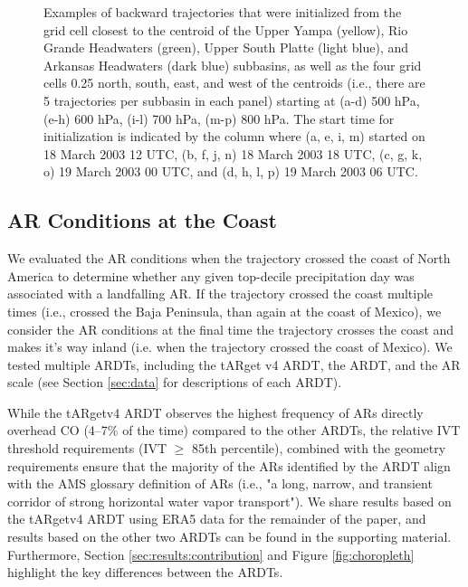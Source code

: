 \documentclass[draft]{agujournal2019}
\begin{document}
\begin{figure}
\caption{Examples of backward trajectories that were initialized from the grid cell closest to the centroid of the Upper Yampa (yellow), Rio Grande Headwaters (green), Upper South Platte (light blue), and Arkansas Headwaters (dark blue) subbasins, as well as the four grid cells 0.25\textdegree{} north, south, east, and west of the centroids (i.e., there are 5 trajectories per subbasin in each panel) starting at (a-d) 500 hPa, (e-h) 600 hPa, (i-l) 700 hPa, (m-p) 800 hPa. The start time for initialization is indicated by the column where (a, e, i, m) started on 18 March 2003 12 UTC, (b, f, j, n) 18 March 2003 18 UTC, (c, g, k, o) 19 March 2003 00 UTC, and (d, h, l, p) 19 March 2003 06 UTC.}
\label{fig:sensitivity_tests}
\end{figure}

\subsection{AR Conditions at the Coast}
\label{sec:methods:ar_conditions}
We evaluated the AR conditions when the trajectory crossed the coast of North America to determine whether any given top-decile precipitation day was associated with a landfalling AR. If the trajectory crossed the coast multiple times (i.e., crossed the Baja Peninsula, than again at the coast of Mexico), we consider the AR conditions at the final time the trajectory crosses the coast and makes it's way inland (i.e. when the trajectory crossed the coast of Mexico). We tested multiple ARDTs, including the  tARget v4 ARDT, the  ARDT, and the AR scale \cite{MartinRalph2019} (see Section \ref{sec:data} for descriptions of each ARDT).

While the tARgetv4 ARDT observes the highest frequency of ARs directly overhead CO (4--7\% of the time) compared to the other ARDTs, the relative IVT threshold requirements (IVT $\geq$ 85th percentile), combined with the geometry requirements ensure that the majority of the ARs identified by the ARDT align with the AMS glossary definition of ARs (i.e., "a long, narrow, and transient corridor of strong horizontal water vapor transport"). We share results based on the tARgetv4 ARDT using ERA5 data for the remainder of the paper, and results based on the other two ARDTs can be found in the supporting material. Furthermore, Section \ref{sec:results:contribution} and Figure \ref{fig:choropleth} highlight the key differences between the ARDTs. 

\end{document}
